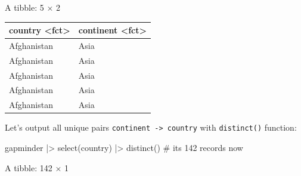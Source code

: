 \documentclass[
  letterpaper,
  DIV=11,
  numbers=noendperiod]{scrreprt}
\newenvironment{Shaded}{\begin{snugshade}}{\end{snugshade}}
\newcommand{\CommentTok}[1]{\textcolor[rgb]{0.37,0.37,0.37}{#1}}
\newcommand{\FunctionTok}[1]{\textcolor[rgb]{0.28,0.35,0.67}{#1}}
\newcommand{\NormalTok}[1]{\textcolor[rgb]{0.00,0.23,0.31}{#1}}
\newcommand{\SpecialCharTok}[1]{\textcolor[rgb]{0.37,0.37,0.37}{#1}}
\begin{document}
A tibble: 5 × 2

\begin{longtable}[]{@{}ll@{}}
\toprule\noalign{}
country \textless fct\textgreater{} & continent
\textless fct\textgreater{} \\
\midrule\noalign{}
\endhead
\bottomrule\noalign{}
\endlastfoot
Afghanistan & Asia \\
Afghanistan & Asia \\
Afghanistan & Asia \\
Afghanistan & Asia \\
Afghanistan & Asia \\
\end{longtable}

Let's output all unique pairs
\texttt{continent\ -\textgreater{}\ country} with \texttt{distinct()}
function:

\begin{Shaded}
\begin{Highlighting}[]
\NormalTok{gapminder }\SpecialCharTok{|\textgreater{}}
    \FunctionTok{select}\NormalTok{(country) }\SpecialCharTok{|\textgreater{}}
    \FunctionTok{distinct}\NormalTok{() }\CommentTok{\# its 142 records now}
\end{Highlighting}
\end{Shaded}

A tibble: 142 × 1
\end{document}
